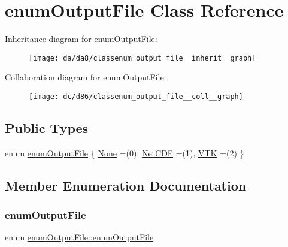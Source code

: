 \hypertarget{classenum_output_file}{}\section{enum\+Output\+File Class Reference}
\label{classenum_output_file}


Inheritance diagram for enum\+Output\+File\+:
\nopagebreak
\begin{figure}[H]
\begin{center}
\leavevmode
\texttt{[image: da/da8/classenum\_output\_file\_\_inherit\_\_graph]}
\end{center}
\end{figure}


Collaboration diagram for enum\+Output\+File\+:
\nopagebreak
\begin{figure}[H]
\begin{center}
\leavevmode
\texttt{[image: dc/d86/classenum\_output\_file\_\_coll\_\_graph]}
\end{center}
\end{figure}
\subsection*{Public Types}
\begin{DoxyCompactItemize}
\item 
enum \hyperlink{classenum_output_file_ab7cf914ae4c61debd1043291538306b3}{enum\+Output\+File} \{ \hyperlink{classenum_output_file_ab7cf914ae4c61debd1043291538306b3aec071c3993deb3de5757bb5ce595dfb3}{None} =(0), 
\hyperlink{classenum_output_file_ab7cf914ae4c61debd1043291538306b3a8c7706fb6cefeeb9897cc4bb6b97c097}{Net\+C\+DF} =(1), 
\hyperlink{classenum_output_file_ab7cf914ae4c61debd1043291538306b3a292c995947276304c23e8f6d04b0b1dd}{V\+TK} =(2)
 \}
\end{DoxyCompactItemize}


\subsection{Member Enumeration Documentation}
\mbox{\label{classenum_output_file_ab7cf914ae4c61debd1043291538306b3}} 
\subsubsection{\texorpdfstring{enum\+Output\+File}{enumOutputFile}}
{\footnotesize\ttfamily enum \hyperlink{classenum_output_file_ab7cf914ae4c61debd1043291538306b3}{enum\+Output\+File\+::enum\+Output\+File}}

